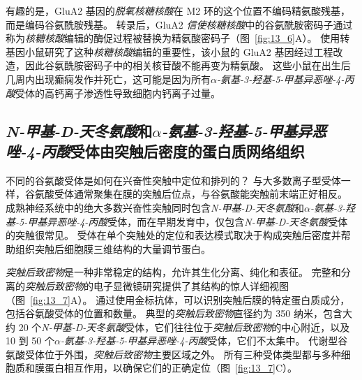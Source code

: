 有趣的是，GluA2 基因的\textit{脱氧核糖核酸}在 M2 环的这个位置不编码精氨酸残基，而是编码谷氨酰胺残基。
转录后，GluA2 \textit{信使核糖核酸}中的谷氨酰胺密码子通过称为\textit{核糖核酸}编辑的酶促过程被替换为精氨酸密码子（图~\ref{fig:13_6}A）。
使用转基因小鼠研究了这种\textit{核糖核酸}编辑的重要性，该小鼠的 GluA2 基因经过工程改造，因此谷氨酰胺密码子中的相关核苷酸不能再变为精氨酸。
这些小鼠在出生后几周内出现癫痫发作并死亡，这可能是因为所有\textit{$\alpha$-氨基-3-羟基-5-甲基异恶唑-4-丙酸}受体的高钙离子渗透性导致细胞内钙离子过量。



\subsection{\textit{N-甲基-D-天冬氨酸}和\textit{$\alpha$-氨基-3-羟基-5-甲基异恶唑-4-丙酸}受体由突触后密度的蛋白质网络组织}

不同的谷氨酸受体是如何在兴奋性突触中定位和排列的？ 
与大多数离子型受体一样，谷氨酸受体通常聚集在膜的突触后位点，与谷氨酸能突触前末端正好相反。
成熟神经系统中的绝大多数兴奋性突触同时包含\textit{N-甲基-D-天冬氨酸}和\textit{$\alpha$-氨基-3-羟基-5-甲基异恶唑-4-丙酸}受体，而在早期发育中，仅包含\textit{N-甲基-D-天冬氨酸}受体的突触很常见。
受体在单个突触处的定位和表达模式取决于构成突触后密度并帮助组织突触后细胞膜三维结构的大量调节蛋白。


\textit{突触后致密物}是一种非常稳定的结构，允许其生化分离、纯化和表征。
完整和分离的\textit{突触后致密物}的电子显微镜研究提供了其结构的惊人详细视图（图~\ref{fig:13_7}A）。 
通过使用金标抗体，可以识别突触后膜的特定蛋白质成分，包括谷氨酸受体的位置和数量。
典型的\textit{突触后致密物}直径约为 350 纳米，包含大约 20 个\textit{N-甲基-D-天冬氨酸}受体，它们往往位于\textit{突触后致密物}的中心附近，以及 10 到 50 个\textit{$\alpha$-氨基-3-羟基-5-甲基异恶唑-4-丙酸}受体，它们不太集中。
代谢型谷氨酸受体位于外围，\textit{突触后致密物}主要区域之外。
所有三种受体类型都与多种细胞质和膜蛋白相互作用，以确保它们的正确定位（图~\ref{fig:13_7}C）。


